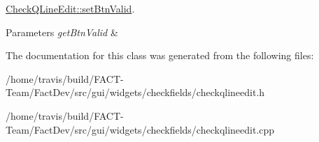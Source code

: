 \hyperlink{classGui_1_1Widgets_1_1CheckFields_1_1CheckQLineEdit_aa5f2ef2358512cf6e7d2eb4af58deb8d}{Check\-Q\-Line\-Edit\-::set\-Btn\-Valid}. 


\begin{DoxyParams}{Parameters}
{\em get\-Btn\-Valid} & \\
\hline
\end{DoxyParams}


The documentation for this class was generated from the following files\-:\begin{DoxyCompactItemize}
\item 
/home/travis/build/\-F\-A\-C\-T-\/\-Team/\-Fact\-Dev/src/gui/widgets/checkfields/checkqlineedit.\-h\item 
/home/travis/build/\-F\-A\-C\-T-\/\-Team/\-Fact\-Dev/src/gui/widgets/checkfields/checkqlineedit.\-cpp\end{DoxyCompactItemize}
